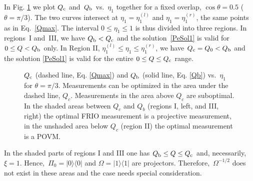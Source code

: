 \documentclass[aps,pra,twocolumn,eqsecnum,showpacs]{revtex4}
\begin{document}
In Fig. \ref{Fig1} we plot $Q_{\rm c}$ and~$Q_{\rm b}$ vs.~$\eta_{1}$ together for a fixed overlap, $\cos\theta = 0.5$ ($\theta = \pi/3$). The two curves intersect at $\eta_1=\eta_{1}^{(l)}$ and $\eta_1=\eta_{1}^{(r)}$, the same points as in Eq.~\eqref{Qmax}.
The interval $0 \leq \eta_{1} \leq 1$ is thus divided  into three regions. In regions~I and~III, we have $Q_{\rm b} < Q_{\rm c}$ and the solution~\eqref{PeSol1} is valid for $0 \leq Q < Q_{\rm b}$ only. In Region II, $\eta_{1}^{(l)} \leq \eta_{1} \leq \eta_{1}^{(r)}$, we have $Q_{\rm c} = Q_{0} < Q_{\rm b}$ and the solution \eqref{PeSol1} is valid for the entire $0 \leq Q \leq Q_{\rm c}$ range.

\begin{figure}[ht!]
     \caption{$Q_{\rm c}$ (dashed line, Eq. \eqref{Qmax}) and $Q_{\rm b}$ (solid line, Eq. \eqref{Qb}) vs.~$\eta_{1}$ for $\theta=\pi/3$. Measurements can be optimized in the area under the dashed line, $Q_{c}$. Measurements in the area above $Q_{c}$ are suboptimal. In the shaded areas between $Q_{c}$ and $Q_{b}$ (regions I, left, and III, right) the optimal FRIO measurement is a projective measurement, in the unshaded area below $Q_{c}$ (region II) the optimal measurement is a POVM.}
     \label{Fig1}
     \end{figure}
 
In the shaded parts of regions I and III one has $Q_{\rm b} \leq Q \leq Q_{\rm c}$ and, necessarily, $\xi=1$. Hence,~$\Pi_0=|0\rangle\langle0|$ and $\Omega=|1\rangle\langle1|$ are projectors. Therefore,~$\Omega^{-1/2}$ does not exist in these areas and the case needs special consideration. 
\end{document}
